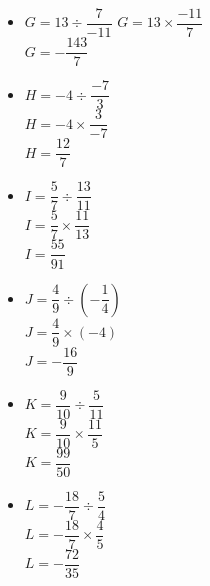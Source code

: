 \begin{corrige}
\begin{multicols}{2}
\begin{spacing}{1.5}
\begin{itemize}
                \item $G=13\div\dfrac{7}{-11}$
                {\red $G=13\times\dfrac{-11}{7}$\\$G=-\dfrac{143}{7}$}\\
                \item $H=-4\div\dfrac{-7}{3}$\\
                {\red $H=-4\times\dfrac{3}{-7}$\\$H=\dfrac{12}{7}$}
                \item $I=\dfrac{5}{7}\div\dfrac{13}{11}$\\
                {\red $I=\dfrac{5}{7}\times\dfrac{11}{13}$\\$I=\dfrac{55}{91}$}\\
                \item $J=\dfrac{4}{9}\div\left(-\dfrac{1}{4}\right)$\\
                {\red $J=\dfrac{4}{9}\times(-4)$\\$J=-\dfrac{16}{9}$}\\
                \item $K=\dfrac{9}{10}\div\dfrac{5}{11}$\\
                {\red $K=\dfrac{9}{10}\times\dfrac{11}{5}$\\$K=\dfrac{99}{50}$}\\
                \item $L=-\dfrac{18}{7}\div\dfrac{5}{4}$\\
                {\red $L=-\dfrac{18}{7}\times\dfrac{4}{5}$\\$L=-\dfrac{72}{35}$}
            \end{itemize}
        \end{spacing}
    \end{multicols}
\end{corrige}

